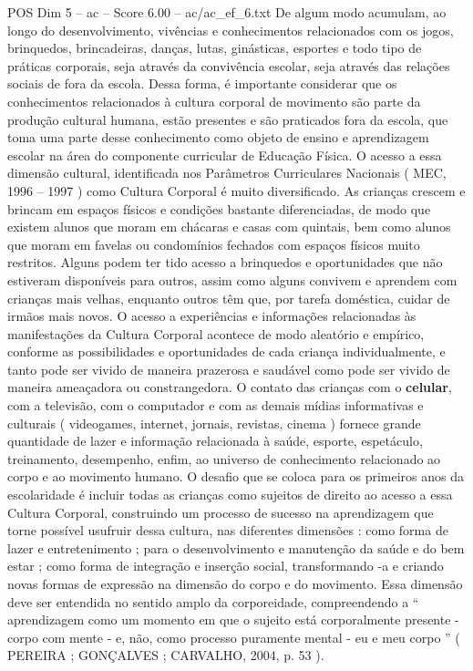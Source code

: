 \begin{textsample}{POS Dim 5 – ac – Score 6.00 – ac/ac\_ef\_6.txt}
De algum modo acumulam, ao longo do desenvolvimento, vivências e conhecimentos relacionados com os jogos, brinquedos, brincadeiras, danças, lutas, ginásticas, esportes e todo tipo de práticas corporais, seja através da convivência escolar, seja através das relações sociais de fora da escola.
Dessa forma, é importante considerar que os conhecimentos relacionados à cultura corporal de movimento são parte da produção cultural humana, estão presentes e são praticados fora da escola, que toma uma parte desse conhecimento como objeto de ensino e aprendizagem escolar na área do componente curricular de Educação Física.
O acesso a essa dimensão cultural, identificada nos Parâmetros Curriculares Nacionais ( MEC, 1996 – 1997 ) como Cultura Corporal é muito diversificado.
As crianças crescem e brincam em espaços físicos e condições bastante diferenciadas, de modo que existem alunos que moram em chácaras e casas com quintais, bem como alunos que moram em favelas ou condomínios fechados com espaços físicos muito restritos.
Alguns podem ter tido acesso a brinquedos e oportunidades que não estiveram disponíveis para outros, assim como alguns convivem e aprendem com crianças mais velhas, enquanto outros têm que, por tarefa doméstica, cuidar de irmãos mais novos.
O acesso a experiências e informações relacionadas às manifestações da Cultura Corporal acontece de modo aleatório e empírico, conforme as possibilidades e oportunidades de cada criança individualmente, e tanto pode ser vivido de maneira prazerosa e saudável como pode ser vivido de maneira ameaçadora ou constrangedora.
O contato das crianças com o \textbf{celular}, com a televisão, com o computador e com as demais mídias informativas e culturais ( videogames, internet, jornais, revistas, cinema ) fornece grande quantidade de lazer e informação relacionada à saúde, esporte, espetáculo, treinamento, desempenho, enfim, ao universo de conhecimento relacionado ao corpo e ao movimento humano.
O desafio que se coloca para os primeiros anos da escolaridade é incluir todas as crianças como sujeitos de direito ao acesso a essa Cultura Corporal, construindo um processo de sucesso na aprendizagem que torne possível usufruir dessa cultura, nas diferentes dimensões : como forma de lazer e entretenimento ; para o desenvolvimento e manutenção da saúde e do bem estar ; como forma de integração e inserção social, transformando -a e criando novas formas de expressão na dimensão do corpo e do movimento.
Essa dimensão deve ser entendida no sentido amplo da corporeidade, compreendendo a “ aprendizagem como um momento em que o sujeito está corporalmente presente - corpo com mente - e, não, como processo puramente mental - eu e meu corpo ” ( PEREIRA ; GONÇALVES ; CARVALHO, 2004, p. 53 ).

\end{textsample}

